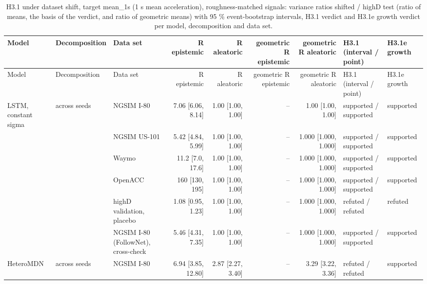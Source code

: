 \begingroup
\footnotesize
\begin{longtable}{lllrrrrll}
\caption{H3.1 under dataset shift, target mean\_1s (1 s mean acceleration), roughness-matched signals: variance ratios shifted / highD test (ratio of means, the basis of the verdict, and ratio of geometric means) with 95 \% event-bootstrap intervals, H3.1 verdict and H3.1e growth verdict per model, decomposition and data set.}\label{tab:t2-h31--matched--mean-1s} \\
\toprule
Model & Decomposition & Data set & R epistemic & R aleatoric & geometric R epistemic & geometric R aleatoric & H3.1 (interval / point) & H3.1e growth \\
\midrule
\endfirsthead
\toprule
Model & Decomposition & Data set & R epistemic & R aleatoric & geometric R epistemic & geometric R aleatoric & H3.1 (interval / point) & H3.1e growth \\
\midrule
\endhead
\bottomrule
\endlastfoot
LSTM, constant sigma & across seeds & NGSIM I-80 & 7.06 [6.06, 8.14] & 1.00 [1.00, 1.00] & -- & 1.00 [1.00, 1.00] & supported / supported & supported \\
 &  & NGSIM US-101 & 5.42 [4.84, 5.99] & 1.00 [1.00, 1.00] & -- & 1.000 [1.000, 1.000] & supported / supported & supported \\
 &  & Waymo & 11.2 [7.0, 17.6] & 1.00 [1.00, 1.00] & -- & 1.000 [1.000, 1.000] & supported / supported & supported \\
 &  & OpenACC & 160 [130, 195] & 1.00 [1.00, 1.00] & -- & 1.000 [1.000, 1.000] & supported / supported & supported \\
 &  & highD validation, placebo & 1.08 [0.95, 1.23] & 1.00 [1.00, 1.00] & -- & 1.000 [1.000, 1.000] & refuted / refuted & refuted \\
 &  & NGSIM I-80 (FollowNet), cross-check & 5.46 [4.31, 7.35] & 1.00 [1.00, 1.00] & -- & 1.000 [1.000, 1.000] & supported / supported & supported \\
\midrule
HeteroMDN & across seeds & NGSIM I-80 & 6.94 [3.85, 12.80] & 2.87 [2.27, 3.40] & -- & 3.29 [3.22, 3.36] & refuted / refuted & supported \\

\end{longtable}

